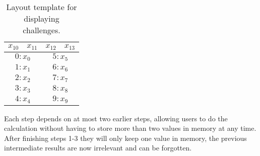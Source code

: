 \begin{table}[h]
    \centering
    \begin{tabular}{|c c|c|c|}
        \hline
        $x_{10}$ & $x_{11}$ & $x_{12}$ & $x_{13}$ \\
        \hline \hline
        \multicolumn{2}{|c|}{$0:x_0$} & \multicolumn{2}{|c|}{$5:x_5$}\\
        \multicolumn{2}{|c|}{$1:x_1$} & \multicolumn{2}{|c|}{$6:x_6$}\\
        \multicolumn{2}{|c|}{$2:x_2$} & \multicolumn{2}{|c|}{$7:x_7$}\\
        \multicolumn{2}{|c|}{$3:x_3$} & \multicolumn{2}{|c|}{$8:x_8$}\\
        \multicolumn{2}{|c|}{$4:x_4$} & \multicolumn{2}{|c|}{$9:x_9$}\\
        \hline 
    \end{tabular}
    \caption{Layout template for displaying challenges.}
    \label{challenges}
\end{table}


\par Each step depends on at most two earlier steps, allowing users to do the calculation without having to store more than two values in memory at any time. After finishing steps 1-3 they will only keep one value in memory, the previous intermediate results are now irrelevant and can be forgotten. 

